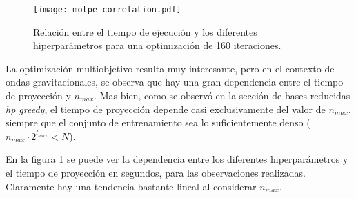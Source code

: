 \begin{figure}[p]
\centering
\texttt{[image: motpe\_correlation.pdf]}
\caption{Relación entre el tiempo de ejecución y los diferentes hiperparámetros para una optimización de 160 iteraciones.}
\label{fig:motpe_param_rel}
\end{figure}


La optimización multiobjetivo resulta muy interesante, pero en el contexto de ondas gravitacionales, se observa que hay una gran dependencia entre el tiempo de proyección y $n_{max}$. Mas bien, como se observó en la sección de bases reducidas \textit{hp greedy}, el tiempo de proyección depende casi exclusivamente del valor de $n_{max}$, siempre que el conjunto de entrenamiento sea lo suficientemente denso ($n_{max} \cdot 2^{l_{max}} < N$).

En la figura \ref{fig:motpe_param_rel} se puede ver la dependencia entre los diferentes hiperparámetros y el tiempo de proyección en segundos, para las observaciones realizadas. Claramente hay una tendencia bastante lineal al considerar $n_{max}$.

